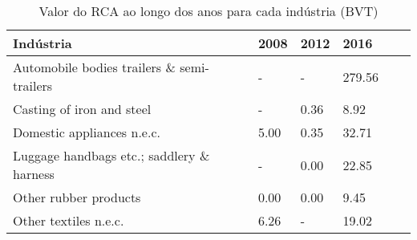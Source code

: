 \begin{table}
\centering
\caption{Valor do RCA ao longo dos anos para cada indústria (BVT)}
\label{tab:ex3-tempo-BVT}
\begin{tabular}{p{6cm}p{1.5cm}p{1.5cm}p{1.5cm}p{1.5cm}p{1.5cm}}
\toprule
                                 Indústria & 2008 & 2012 &   2016 \\
\midrule
Automobile bodies trailers \& semi-trailers &    - &    - & 279.56 \\
                 Casting of iron and steel &    - & 0.36 &   8.92 \\
                Domestic appliances n.e.c. & 5.00 & 0.35 &  32.71 \\
 Luggage handbags etc.; saddlery \& harness &    - & 0.00 &  22.85 \\
                     Other rubber products & 0.00 & 0.00 &   9.45 \\
                     Other textiles n.e.c. & 6.26 &    - &  19.02 \\
\bottomrule
\end{tabular}
\end{table}
